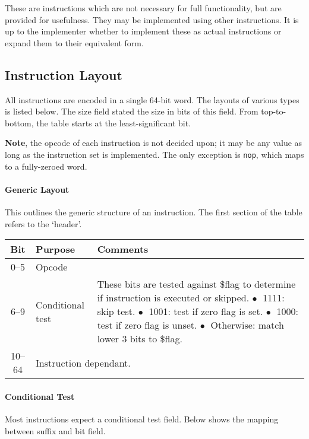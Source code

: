 \documentclass[10pt]{article}
\begin{document}
    These are instructions which are not necessary for full functionality, but are provided for usefulness.
    They may be implemented using other instructions.
    It is up to the implementer whether to implement these as actual instructions or expand them to their equivalent form.

    \subsection{Instruction Layout}\label{subsec:instruction-layout}

    All instructions are encoded in a single 64-bit word.
    The layouts of various types is listed below.
    The size field stated the size in bits of this field.
    From top-to-bottom, the table starts at the least-significant bit.

    \textbf{Note}, the opcode of each instruction is not decided upon; it may be any value as long as the instruction set is implemented.
    The only exception is \texttt{nop}, which maps to a fully-zeroed word.

    \paragraph{Generic Layout}
    This outlines the generic structure of an instruction.
    The first section of the table refers to the `header'.

    \bigskip
    \begin{tabular}{|c|l|l|}
        \hline
        \textbf{Bit} & \textbf{Purpose} & \textbf{Comments} \\
        \hline
        0--5 & Opcode & \\
        \hline
        6--9 & Conditional test & \makecell[l]{These bits are tested against \$flag to determine if instruction is executed or skipped.\\%
        \(\bullet\;\) 1111: skip test.\\%
        \(\bullet\;\) 1001: test if zero flag is set.\\%
        \(\bullet\;\) 1000: test if zero flag is unset.\\%
        \(\bullet\;\) Otherwise: match lower 3 bits to \$flag.} \\
        \hline
        \hline
        10--64 & \multicolumn{2}{l|}{Instruction dependant.} \\
        \hline
    \end{tabular}

    \paragraph{Conditional Test}
    Most instructions expect a conditional test field.
    Below shows the mapping between suffix and bit field.
\end{document}
